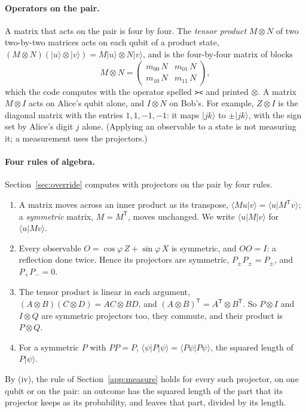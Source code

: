 \documentclass[11pt]{article}
\begin{document}
\paragraph{Operators on the pair.} A matrix that acts on the pair is four by four. The \emph{tensor product} $M \otimes N$ of two two-by-two matrices acts on each qubit of a product state, $(M \otimes N)(|u\rangle \otimes |v\rangle) = M|u\rangle \otimes N|v\rangle$, and is the four-by-four matrix of blocks
\[
  M \otimes N = \begin{pmatrix} m_{00}\, N & m_{01}\, N \\ m_{10}\, N & m_{11}\, N \end{pmatrix},
\]
which the code computes with the operator spelled \texttt{>{}<} and printed $\otimes$. A matrix $M \otimes I$ acts on Alice's qubit alone, and $I \otimes N$ on Bob's. For example, $Z \otimes I$ is the diagonal matrix with the entries $1, 1, -1, -1$: it maps $|jk\rangle$ to $\pm|jk\rangle$, with the sign set by Alice's digit $j$ alone. (Applying an observable to a state is not measuring it; a measurement uses the projectors.)

\paragraph{Four rules of algebra.} Section~\ref{sec:override} computes with projectors on the pair by four rules.
\begin{enumerate}[label=(\roman*)]
\item A matrix moves across an inner product as its transpose, $\langle Mu|v\rangle = \langle u|M^{\mathsf T}v\rangle$; a \emph{symmetric} matrix, $M = M^{\mathsf T}$, moves unchanged. We write $\langle u|M|v\rangle$ for $\langle u|Mv\rangle$.
\item Every observable $O = \cos\varphi\,Z + \sin\varphi\,X$ is symmetric, and $OO = I$: a reflection done twice. Hence its projectors are symmetric, $P_\pm P_\pm = P_\pm$, and $P_+ P_- = 0$.
\item The tensor product is linear in each argument, $(A \otimes B)(C \otimes D) = AC \otimes BD$, and $(A \otimes B)^{\mathsf T} = A^{\mathsf T} \otimes B^{\mathsf T}$. So $P \otimes I$ and $I \otimes Q$ are symmetric projectors too, they commute, and their product is $P \otimes Q$.
\item For a symmetric $P$ with $PP = P$, $\langle\psi|P|\psi\rangle = \langle P\psi|P\psi\rangle$, the squared length of $P|\psi\rangle$.
\end{enumerate}
By (iv), the rule of Section~\ref{app:measure} holds for every such projector, on one qubit or on the pair: an outcome has the squared length of the part that its projector keeps as its probability, and leaves that part, divided by its length.
\end{document}
